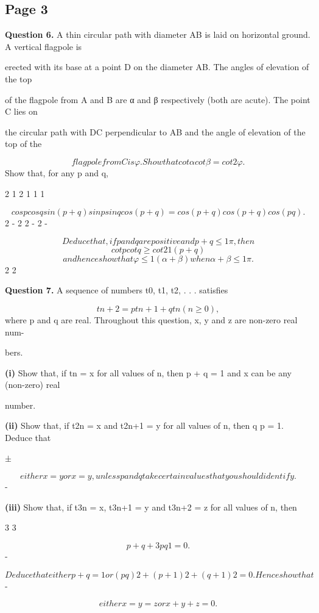 \documentclass[12pt]{article}
\begin{document}
\subsection*{Page 3}
\begin{flushleft}
\sigma\par
\bigskip\textbf{Question 6.} A thin circular path with diameter AB is laid on horizontal ground. A vertical flagpole is\par
erected with its base at a point D on the diameter AB. The angles of elevation of the top\par
of the flagpole from A and B are α and β respectively (both are acute). The point C lies on\par
the circular path with DC perpendicular to AB and the angle of elevation of the top of the\par
\[flagpole from C is φ. Show that cot α cot β = cot2 φ.\]
Show that, for any p and q,\par
2 1 2 1 1 1\par
\[cos p cos q sin (p + q) sin p sin q cos (p + q) = cos(p + q) cos(p + q) cos(p q).\]
2 - 2 2 - 2 -\par
\[Deduce that, if p and q are positive and p + q \leq 1 \pi, then\]
\[cot p cot q \geq cot 2 1 (p + q)\]
\[and hence show that φ \leq 1 (α + β) when α + β \leq 1 \pi .\]
2 2\par
\bigskip\textbf{Question 7.} A sequence of numbers t0, t1, t2, . . . satisfies\par
\[tn+2 = ptn+1 + qtn (n \geq 0),\]
where p and q are real. Throughout this question, x, y and z are non-zero real num-\par
bers.\par
\textbf{(i)} Show that, if tn = x for all values of n, then p + q = 1 and x can be any (non-zero) real\par
number.\par
\textbf{(ii)} Show that, if t2n = x and t2n+1 = y for all values of n, then q p = 1. Deduce that\par
±\par
\[either x = y or x = y, unless p and q take certain values that you should identify.\]
-\par
\textbf{(iii)} Show that, if t3n = x, t3n+1 = y and t3n+2 = z for all values of n, then\par
3 3\par
\[p + q + 3pq 1 = 0 .\]
-\par
\[Deduce that either p + q = 1 or (p q)2 + (p + 1)2 + (q + 1)2 = 0. Hence show that\]
-\par
\[either x = y = z or x + y + z = 0.\]
\end{flushleft}
\end{document}
